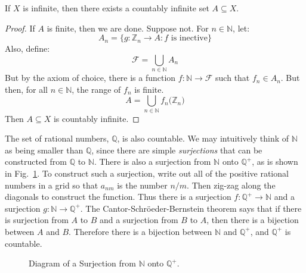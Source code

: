     \begin{theorem}
        If $X$ is infinite, then there exists a
        countably infinite set $A\subseteq{X}$.
    \end{theorem}
    \begin{proof}
        If $A$ is finite, then we are done. Suppose not.
        For $n\in\mathbb{N}$, let:
        \begin{equation}
            A_{n}
            =\{g:\mathbb{Z}_{n}\rightarrow{A}:f\textrm{ is inective}\}
        \end{equation}
        Also, define:
        \begin{equation}
            \mathcal{F}=\bigcup_{n\in\mathbb{N}}A_{n}
        \end{equation}
        But by the axiom of choice, there is a function
        $f:\mathbb{N}\rightarrow\mathcal{F}$ such that
        $f_{n}\in{A}_{n}$. But then, for all
        $n\in\mathbb{N}$, the range of $f_{n}$ is finite.
        \begin{equation}
            A=\bigcup_{n\in\mathbb{N}}f_{n}
                \Big(\mathbb{Z}_{n}\Big)
        \end{equation}
        Then $A\subseteq{X}$ is countably infinite.
    \end{proof}
    The set of rational numbers, $\mathbb{Q}$, is also
    countable. We may intuitively think of $\mathbb{N}$
    as being smaller than $\mathbb{Q}$, since there are
    simple \textit{surjections} that can be constructed
    from $\mathbb{Q}$ to $\mathbb{N}$. There is also a
    surjection from $\mathbb{N}$ onto $\mathbb{Q}^{+}$,
    as is shown in Fig.~\ref{fig:Bijection_N_and_Q_Plus}.
    To construct such a surjection, write out all of the
    positive rational numbers in a grid so that $a_{nm}$
    is the number $n/m$. Then zig-zag along the diagonals
    to construct the function. Thus there is a surjection
    $f:\mathbb{Q}^{+}\rightarrow\mathbb{N}$ and a surjection
    $g:\mathbb{N}\rightarrow\mathbb{Q}^{+}$. The
    Cantor-Schr\"{o}eder-Bernstein theorem says that if there is
    surjection from $A$ to $B$ and a surjection from $B$ to $A$, then
    there is a bijection between $A$ and $B$. Therefore there is a
    bijection between $\mathbb{N}$ and $\mathbb{Q}^{+}$, and
    $\mathbb{Q}^{+}$ is countable.
    \begin{figure}[H]
        \centering
        \captionsetup{type=figure}
        \resizebox{0.7\textwidth}{!}{%
            
        }
        \caption{Diagram of a Surjection from
                 $\mathbb{N}$ onto $\mathbb{Q}^{+}$.}
        \label{fig:Bijection_N_and_Q_Plus}
    \end{figure}
